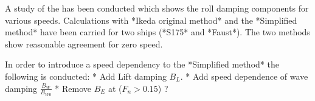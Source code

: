 A study of the has been conducted which shows the roll damping components for various speeds. Calculations with *Ikeda original method* and the *Simplified method* have been carried for two ships (*S175* and *Faust*). The two methods show reasonable agreement for zero speed.

In order to introduce a speed dependency to the *Simplified method* the following is conducted:
* Add Lift damping $B_L$.
* Add speed dependence of wave damping $\frac{B_W}{B_{W0}}$
* Remove $B_E$ at ($F_n>0.15$) ?



